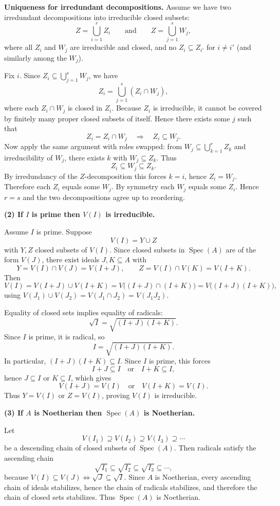 \documentclass[12pt,a4paper]{article}
\DeclareMathOperator{\Spec}{Spec}
\theoremstyle{plain}
\theoremstyle{definition}      %
\begin{document}
	\medskip
	\textbf{Uniqueness for irredundant decompositions.}
	Assume we have two irredundant decompositions into irreducible closed subsets:
	\[
	Z=\bigcup_{i=1}^r Z_i
	\qquad\text{and}\qquad
	Z=\bigcup_{j=1}^s W_j,
	\]
	where all $Z_i$ and $W_j$ are irreducible and closed, and no $Z_i\subseteq Z_{i'}$ for $i\neq i'$
	(and similarly among the $W_j$).
	
	Fix $i$. Since $Z_i\subseteq \bigcup_{j=1}^s W_j$, we have
	\[
	Z_i=\bigcup_{j=1}^s (Z_i\cap W_j),
	\]
	where each $Z_i\cap W_j$ is closed in $Z_i$.
	Because $Z_i$ is irreducible, it cannot be covered by finitely many proper closed subsets of itself.
	Hence there exists some $j$ such that
	\[
	Z_i=Z_i\cap W_j \quad\Longrightarrow\quad Z_i\subseteq W_j.
	\]
	Now apply the same argument with roles swapped: from $W_j\subseteq \bigcup_{k=1}^r Z_k$ and irreducibility of $W_j$,
	there exists $k$ with $W_j\subseteq Z_k$. Thus
	\[
	Z_i\subseteq W_j\subseteq Z_k.
	\]
	By irredundancy of the $Z$-decomposition this forces $k=i$, hence $Z_i=W_j$.
	Therefore each $Z_i$ equals some $W_j$. By symmetry each $W_j$ equals some $Z_i$.
	Hence $r=s$ and the two decompositions agree up to reordering.
	
	\bigskip
	\textbf{(2) If $I$ is prime then $V(I)$ is irreducible.}
	
	Assume $I$ is prime. Suppose
	\[
	V(I)=Y\cup Z
	\]
	with $Y,Z$ closed subsets of $V(I)$.
	Since closed subsets in $\Spec(A)$ are of the form $V(J)$, there exist ideals $J,K\subseteq A$ with
	\[
	Y=V(I)\cap V(J)=V(I+J),
	\qquad
	Z=V(I)\cap V(K)=V(I+K).
	\]
	Then
	\[
	V(I)=V(I+J)\cup V(I+K)=V\bigl((I+J)\cap(I+K)\bigr)=V\bigl((I+J)(I+K)\bigr),
	\]
	using $V(J_1)\cup V(J_2)=V(J_1\cap J_2)=V(J_1J_2)$.
	
	Equality of closed sets implies equality of radicals:
	\[
	\sqrt{I}=\sqrt{(I+J)(I+K)}.
	\]
	Since $I$ is prime, it is radical, so
	\[
	I=\sqrt{(I+J)(I+K)}.
	\]
	In particular, $(I+J)(I+K)\subseteq I$. Since $I$ is prime, this forces
	\[
	I+J\subseteq I \quad\text{or}\quad I+K\subseteq I,
	\]
	hence $J\subseteq I$ or $K\subseteq I$, which gives
	\[
	V(I+J)=V(I)\quad\text{or}\quad V(I+K)=V(I).
	\]
	Thus $Y=V(I)$ or $Z=V(I)$, proving $V(I)$ is irreducible.
	
	\bigskip
	\textbf{(3) If $A$ is Noetherian then $\Spec(A)$ is Noetherian.}
	
	Let
	\[
	V(I_1)\supseteq V(I_2)\supseteq V(I_3)\supseteq \cdots
	\]
	be a descending chain of closed subsets of $\Spec(A)$.
	Then radicals satisfy the ascending chain
	\[
	\sqrt{I_1}\subseteq \sqrt{I_2}\subseteq \sqrt{I_3}\subseteq \cdots,
	\]
	because $V(I)\subseteq V(J)\iff \sqrt{J}\subseteq \sqrt{I}$.
	Since $A$ is Noetherian, every ascending chain of ideals stabilizes, hence the chain of radicals stabilizes,
	and therefore the chain of closed sets stabilizes. Thus $\Spec(A)$ is Noetherian.
	
\end{document}
